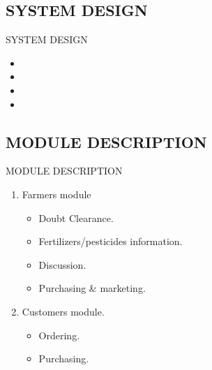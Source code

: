  \subsection{SYSTEM DESIGN}
  \begin{frame}{SYSTEM DESIGN}
  \begin{itemize}
  \item  
  \item 
  \item 
  \item 
\end{itemize}
 \end{frame}
  
 
 \subsection{MODULE DESCRIPTION}
\begin{frame}{MODULE DESCRIPTION}
   \begin{enumerate}
  \item Farmers module
  \begin{itemize}
   \item Doubt Clearance.
  \item Fertilizers/pesticides information.
  \item Discussion.
  \item Purchasing & marketing.
  \end{itemize}
 
  \item Customers module.
  \begin{itemize}
  \item Ordering.
  \item Purchasing.
   \end{itemize}
  \end{enumerate}
  \end{frame}
  
  
